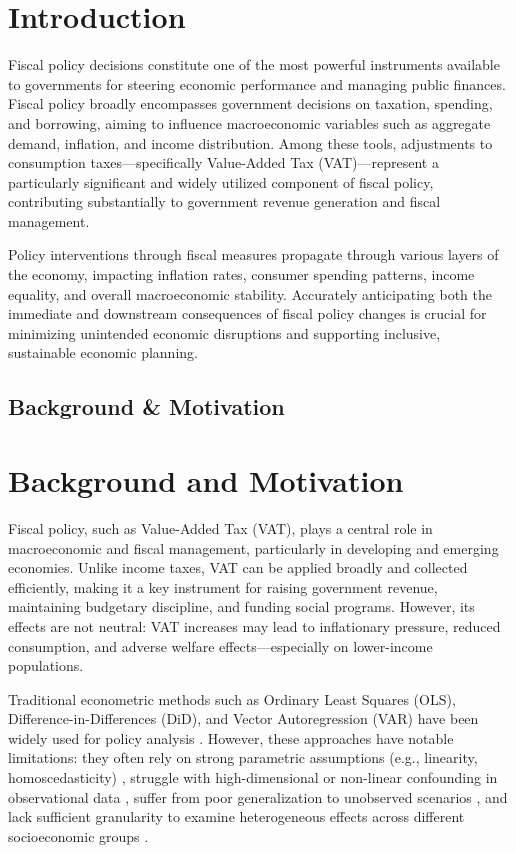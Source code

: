 \section{Introduction}\label{sec:intro}

Fiscal policy decisions constitute one of the most powerful instruments available to governments for steering economic performance and managing public finances. Fiscal policy broadly encompasses government decisions on taxation, spending, and borrowing, aiming to influence macroeconomic variables such as aggregate demand, inflation, and income distribution. Among these tools, adjustments to consumption taxes—specifically Value-Added Tax (VAT)—represent a particularly significant and widely utilized component of fiscal policy, contributing substantially to government revenue generation and fiscal management.

Policy interventions through fiscal measures propagate through various layers of the economy, impacting inflation rates, consumer spending patterns, income equality, and overall macroeconomic stability. Accurately anticipating both the immediate and downstream consequences of fiscal policy changes is crucial for minimizing unintended economic disruptions and supporting inclusive, sustainable economic planning.

\subsection{Background \& Motivation} \label{subsec:background}

\section{Background and Motivation}

Fiscal policy, such as Value-Added Tax (VAT), plays a central role in macroeconomic and fiscal management, particularly in developing and emerging economies. Unlike income taxes, VAT can be applied broadly and collected efficiently, making it a key instrument for raising government revenue, maintaining budgetary discipline, and funding social programs. However, its effects are not neutral: VAT increases may lead to inflationary pressure, reduced consumption, and adverse welfare effects—especially on lower-income populations.

Traditional econometric methods such as Ordinary Least Squares (OLS), Difference-in-Differences (DiD), and Vector Autoregression (VAR) have been widely used for policy analysis \citep{wooldridge2010econometric, angrist2008mostly, lutkepohl2005new}. However, these approaches have notable limitations: they often rely on strong parametric assumptions (e.g., linearity, homoscedasticity) \citep{wooldridge2010econometric}, struggle with high-dimensional or non-linear confounding in observational data \citep{athey2018machine}, suffer from poor generalization to unobserved scenarios \citep{athey2019policy}, and lack sufficient granularity to examine heterogeneous effects across different socioeconomic groups \citep{wager2019estimation}.

